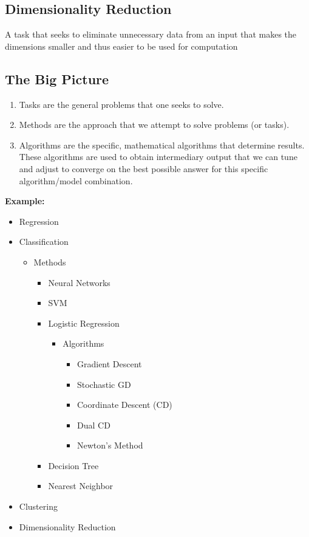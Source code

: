\documentclass[11pt]{article}
\begin{document}
\subsection{Dimensionality Reduction}
\label{sec:orgeb985df}

A task that seeks to eliminate unnecessary data from an input that makes the dimensions smaller and thus easier to be used for computation


\subsection{The Big Picture}
\label{sec:org2bb36b3}

\begin{enumerate}
\item Tasks are the general problems that one seeks to solve.
\item Methods are the approach that we attempt to solve problems (or tasks).
\item Algorithms are the specific, mathematical algorithms that determine results. These algorithms are used to obtain intermediary output that we can tune and adjust to converge on the best possible answer for this specific algorithm/model combination.
\end{enumerate}

\textbf{\textbf{Example:}}

\begin{itemize}
\item Regression
\item Classification
\begin{itemize}
\item Methods
\begin{itemize}
\item Neural Networks
\item SVM
\item Logistic Regression
\begin{itemize}
\item Algorithms
\begin{itemize}
\item Gradient Descent
\item Stochastic GD
\item Coordinate Descent (CD)
\item Dual CD
\item Newton's Method
\end{itemize}
\end{itemize}
\item Decision Tree
\item Nearest Neighbor
\end{itemize}
\end{itemize}
\item Clustering
\item Dimensionality Reduction
\end{itemize}
\end{document}
